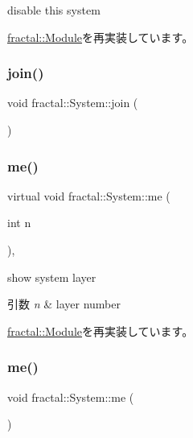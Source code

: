 disable this system 



\hyperlink{classfractal_1_1Module_a17a7773769fb523fd4b2aeb28366debe}{fractal\+::\+Module}を再実装しています。

\mbox{\label{classfractal_1_1System_afcd530ae6b4fd18a74fb807e56bd5fff}} 
\subsubsection{\texorpdfstring{join()}{join()}}
{\footnotesize\ttfamily void fractal\+::\+System\+::join (\begin{DoxyParamCaption}{ }\end{DoxyParamCaption})\hspace{0.3cm}{\ttfamily [inline]}}

\mbox{\label{classfractal_1_1System_aa8e8768417ccfe745def786d63eee80d}} 
\subsubsection{\texorpdfstring{me()}{me()}\hspace{0.1cm}{\footnotesize\ttfamily [1/2]}}
{\footnotesize\ttfamily virtual void fractal\+::\+System\+::me (\begin{DoxyParamCaption}\item[{int}]{n }\end{DoxyParamCaption})\hspace{0.3cm}{\ttfamily [inline]}, {\ttfamily [virtual]}}



show system layer 


\begin{DoxyParams}{引数}
{\em n} & layer number \\
\hline
\end{DoxyParams}


\hyperlink{classfractal_1_1Module_a92deaafb88a2bc34958dca99fdc112a3}{fractal\+::\+Module}を再実装しています。

\mbox{\label{classfractal_1_1System_ae1da12b267d3fe5b811e4130ae888b50}} 
\subsubsection{\texorpdfstring{me()}{me()}\hspace{0.1cm}{\footnotesize\ttfamily [2/2]}}
{\footnotesize\ttfamily void fractal\+::\+System\+::me (\begin{DoxyParamCaption}{ }\end{DoxyParamCaption})\hspace{0.3cm}{\ttfamily [inline]}}



